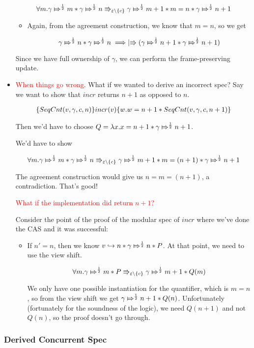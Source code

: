 \begin{itemize}
\[
\forall m. \apointsto{\gamma}{m}{\frac{1}{2}} * \apointsto{\gamma}{n}{\frac{1}{2}} \Rrightarrow_{\varepsilon \backslash \{c\}} \apointsto{\gamma}{m + 1}{\frac{1}{2}} * m = n * \apointsto{\gamma}{n + 1}{\frac{1}{2}}
\]

\begin{itemize}
\item Again, from the agreement construction, we know that $m = n$, so we get

\[
\apointsto{\gamma}{n}{\frac{1}{2}} * \apointsto{\gamma}{n}{\frac{1}{2}} \implies \upmod{ (\apointsto{\gamma}{n + 1}{\frac{1}{2}} * \apointsto{\gamma}{n + 1}{\frac{1}{2}}) }
\]
\end{itemize}

Since we have full ownership of $\gamma$, we can perform the frame-preserving update.

\item \textcolor{red}{When things go wrong}. What if we wanted to derive an incorrect spec?
Say we want to show that $incr$ returns $n + 1$ as opposed to $n$.

\begin{align*}
\hot{\SCnt{v}{\gamma}{c}{n}}{incr(v)}{w. w = n + 1 * \SCnt{v}{\gamma}{c}{n + 1}}
\end{align*}

Then we'd have to choose $Q = \lambda x. x = n + 1 * \apointsto{\gamma}{n + 1}{\frac{1}{2}}$.

We'd have to show


\[
\forall m. \apointsto{\gamma}{m}{\frac{1}{2}} * \apointsto{\gamma}{n}{\frac{1}{2}} \Rrightarrow_{\varepsilon \backslash \{c\}} \apointsto{\gamma}{m + 1}{\frac{1}{2}} * m = (n + 1) * \apointsto{\gamma}{n + 1}{\frac{1}{2}}
\]

The agreement construction would give us $n = m = (n + 1)$, a contradiction. That's good!

\textcolor{red}{What if the implementation did return $n + 1$?}

Consider the point of the proof of the modular spec of $incr$ where we've done the CAS and it was successful:

\begin{itemize}
\item If $n' = n$, then we know $\pointsto{v}{n} * \apointsto{\gamma}{n}{\frac{1}{2}} * P$.
At that point, we need to use the view shift.

\[
\forall m. \apointsto{\gamma}{m}{\frac{1}{2}} * P \Rrightarrow_{\varepsilon \backslash \{c\}} \apointsto{\gamma}{m + 1}{\frac{1}{2}} * Q(m)
\]

We only have one possible instantiation for the quantifier, which is $m = n$, so from the view shift we get $\apointsto{\gamma}{n + 1}{\frac{1}{2}} * Q(n)$. Unfortunately (fortunately for the soundness of the logic), we need $Q(n + 1)$ and not $Q(n)$, so the proof doesn't go through.
\end{itemize}

\end{itemize}

\subsubsection{Derived Concurrent Spec}


